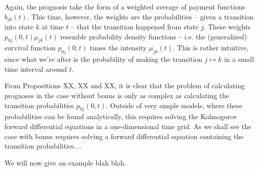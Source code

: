 \documentclass{book}
\newcommand{\1}[1]{\mathbbm{1}_{\left\lbrace #1 \right\rbrace}}
\theoremstyle{break}
\theoremstyle{remark}
\newenvironment{remark}
  {\pushQED{\qed}\renewcommand{\qedsymbol}{\scalebox{1.4}{$\circ$}}\remarkx}
  {\popQED\endremarkx}
\numberwithin{equation}{section}
\begin{document}
Again, the prognosis take the form of a weighted average of payment functions $b_{jk}(t)$. This time, however, the weights are the probabilities -- given a transition into state $k$ at time $t$ -- that the transition happened from state $j$. These weights $p_{0j}(0,t) \mu_{jk}(t)$ resemble probability density functions -- i.e. the (generalized) survival function $p_{0j}(0,t)$ times the intensity $\mu_{jk}(t)$. This is rather intuitive, since what we're after is the probability of making the transition $j \mapsto k$ in a small time interval around $t$.

\begin{remark}
	From Propositions XX, XX and XX, it is clear that the problem of calculating prognoses in the case without bonus is only as complex as calculating the transition probabilities $p_{0j}(0,t)$. Outside of very simple models, where these probabilities can be found analytically, this requires solving the Kolmogorov forward differential equations in a one-dimensional time grid. As we shall see the case with bonus requires solving a forward differential equation containing the transition probabilities....
\end{remark}

We will now give an example blah blah.
\end{document}
